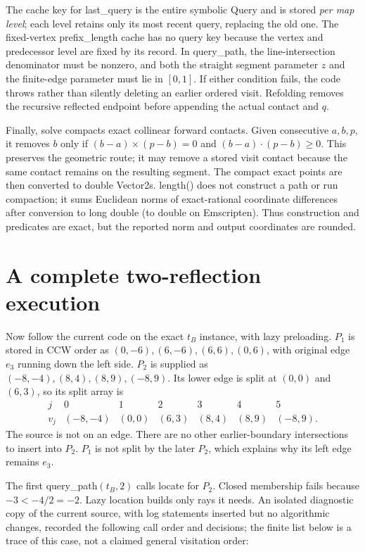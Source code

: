 \documentclass[12pt,a4paper]{article}
\newcommand{\cross}{\mathbin{\times}}
\newcommand{\code}[1]{{\ttfamily\color{codekw}#1}}
\begin{document}
The cache key for \code{last\_query} is the entire symbolic Query and is stored \emph{per map level}; each level retains only its most recent query, replacing the old one. The fixed-vertex \code{prefix\_length} cache has no query key because the vertex and predecessor level are fixed by its record. In \code{query\_path}, the line-intersection denominator must be nonzero, and both the straight segment parameter \(z\) and the finite-edge parameter must lie in \([0,1]\). If either condition fails, the code throws rather than silently deleting an earlier ordered visit. Refolding removes the recursive reflected endpoint before appending the actual contact and \(q\).

Finally, \code{solve} compacts exact collinear forward contacts. Given consecutive \(a,b,p\), it removes \(b\) only if \((b-a)\cross(p-b)=0\) and \((b-a)\cdot(p-b)\ge0\). This preserves the geometric route; it may remove a stored visit contact because the same contact remains on the resulting segment. The compact exact points are then converted to double \code{Vector2}s. \code{length()} does not construct a path or run compaction; it sums Euclidean norms of exact-rational coordinate differences after conversion to \code{long double} (to \code{double} on Emscripten). Thus construction and predicates are exact, but the reported norm and output coordinates are rounded.

\section{A complete two-reflection execution}\label{sec:execution}
Now follow the current code on the exact \(t_B\) instance, with lazy preloading. \(P_1\) is stored in CCW order as \((0,-6),(6,-6),(6,6),(0,6)\), with original edge \(e_3\) running down the left side. \(P_2\) is supplied as \((-8,-4),(8,4),(8,9),(-8,9)\). Its lower edge is split at \((0,0)\) and \((6,3)\), so its split array is
\[
\begin{array}{c|rrrrrr}
j&0&1&2&3&4&5\\\hline
v_j&(-8,-4)&(0,0)&(6,3)&(8,4)&(8,9)&(-8,9).
\end{array}
\]
The source is not on an edge. There are no other earlier-boundary intersections to insert into \(P_2\). \(P_1\) is not split by the later \(P_2\), which explains why its left edge remains \(e_3\).

The first \code{query\_path}\((t_B,2)\) calls \code{locate} for \(P_2\). Closed membership fails because \(-3<-4/2=-2\). Lazy location builds only rays it needs. An isolated diagnostic copy of the current source, with log statements inserted but no algorithmic changes, recorded the following call order and decisions; the finite list below is a trace of this case, not a claimed general visitation order:
\end{document}

